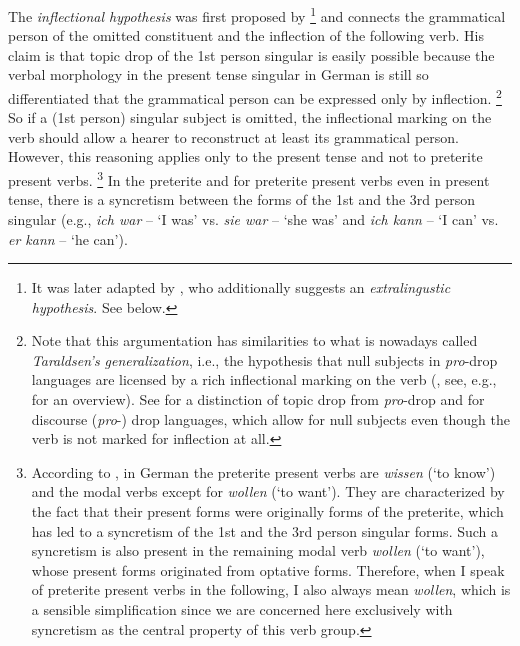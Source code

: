 The \textit{inflectional hypothesis} was first proposed by \citet[198]{auer1993}%
\footnote{It was later adapted by \citet{imo2013, imo2014}, who additionally suggests an \textit{extralingustic hypothesis}. See below.}
%
and connects the grammatical person of the omitted constituent and the inflection of the following verb.
His claim is that topic drop of the 1st person singular is easily possible because the verbal morphology in the present tense singular in German is still so differentiated that the grammatical person can be expressed only by inflection.%
\footnote{Note that this argumentation has similarities to what is nowadays called \textit{Taraldsen's generalization}, i.e., the hypothesis that null subjects  in \textit{pro}-drop languages are licensed by a rich inflectional marking on the verb (\cite{taraldsen1980}, see, e.g., \cite{roberts2014} for an overview).
See  for a distinction of topic drop from \textit{pro}-drop and  for discourse (\textit{pro}-) drop languages, which allow for null subjects  even though the verb is not marked for inflection at all.
}
%
So if a (1st person) singular subject is omitted, the inflectional marking on the verb should allow a hearer to reconstruct at least its grammatical person.
However, this reasoning applies only to the present tense and not to preterite present verbs.%
\footnote{According to \citet[1258]{zifonun.etal1997}, in German the preterite present verbs are \textit{wissen} (`to know') and the modal verbs except for \textit{wollen} (`to want'). 
They are characterized by the fact that their present forms were originally forms of the preterite, which has led to a syncretism  of the 1st and the 3rd person singular forms.
Such a syncretism  is also present in the remaining modal verb \textit{wollen} (`to want'), whose present forms originated from optative forms.
Therefore, when I speak of preterite present verbs in the following, I also always mean \textit{wollen}, which is a sensible simplification since we are concerned here exclusively with syncretism  as the central property of this verb group.
}
%
In the preterite and for preterite present verbs even in present tense, there is a syncretism  between the forms of the 1st and the 3rd person singular (e.g., \textit{ich war} -- `I was' vs. \textit{sie war} -- `she was' and \textit{ich kann} -- `I can' vs. \textit{er kann} -- `he can').
